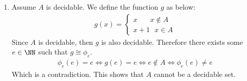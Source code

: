 \begin{enumerate}[label=]
    \item 
        Assume $A$ is decidable. We define the function $g$ as below:
        \begin{gather*}
            g(x) = \begin{cases}
                x \ \ \ \ \ \ \ \ x \notin A \\
                x + 1 \ \ \ x \in A
            \end{cases}
        \end{gather*}
        Since $A$ is decidable, then $g$ is also decidable. Therefore there exists some $e \in \NN$ such that $g \cong \phi_e$.
        \begin{gather*}
            \phi_e(e) = e \iff g(e) = e \iff e \notin A \iff \phi_e(e) \ne e
        \end{gather*}
        Which is a contradiction. This shows that $A$ cannot be a decidable set.
\end{enumerate}